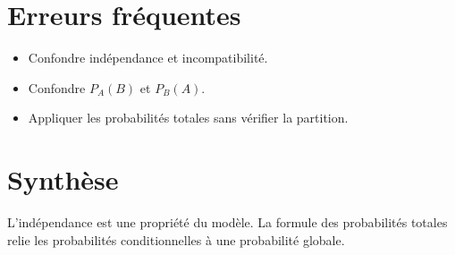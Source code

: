 \section{Erreurs fréquentes}
\begin{itemize}
\item Confondre indépendance et incompatibilité.
\item Confondre $P_A(B)$ et $P_B(A)$.
\item Appliquer les probabilités totales sans vérifier la partition.
\end{itemize}

\section{Synthèse}
L’indépendance est une propriété du modèle. La formule des probabilités totales relie les probabilités conditionnelles à une probabilité globale.
